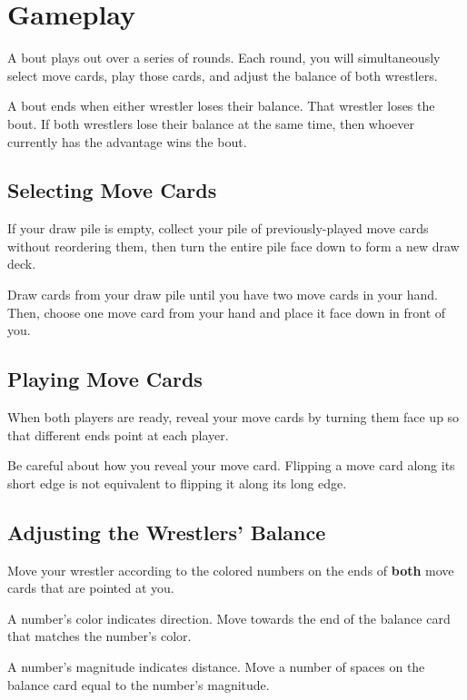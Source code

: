 \section*{Gameplay}

A bout plays out over a series of rounds.
Each round, you will simultaneously select move cards, play those cards, and adjust the balance of both wrestlers.

A bout ends when either wrestler loses their balance.
That wrestler loses the bout.
If both wrestlers lose their balance at the same time, then whoever currently has the advantage wins the bout.

\subsection*{Selecting Move Cards}
If your draw pile is empty, collect your pile of previously-played move cards without reordering them, then turn the entire pile face down to form a new draw deck.

Draw cards from your draw pile until you have two move cards in your hand.
Then, choose one move card from your hand and place it face down in front of you.

{
\recalctypearea
\subsection*{Playing Move Cards}
When both players are ready, reveal your move cards by turning them face up so that different ends point at each player.

Be careful about how you reveal your move card.
Flipping a move card along its short edge is not equivalent to flipping it along its long edge.

\subsection*{Adjusting the Wrestlers' Balance}
Move your wrestler according to the colored numbers on the ends of \textbf{both} move cards that are pointed at you.

A number's color indicates direction. Move towards the end of the balance card that matches the number's color. 

A number's magnitude indicates distance. Move a number of spaces on the balance card equal to the number's magnitude.

}